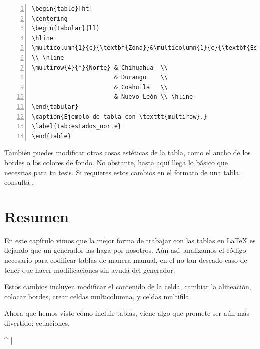 \begin{lstlisting}[style=latex,numbers=left,caption={Tabla con columna de cuatro filas de alto.},label={lst:tabla_estados},
linebackgroundcolor={%
	\ifnum \value{lstnumber} =  7 \color{codigo_linea_resaltada}
	\else \color{codigo_fondo}
	\fi % Tantos \fi como líneas subrayadas.
}]
\begin{table}[ht]
\centering
\begin{tabular}{ll}
\hline
\multicolumn{1}{c}{\textbf{Zona}}&\multicolumn{1}{c}{\textbf{Estado}}
\\ \hline
\multirow{4}{*}{Norte} & Chihuahua  \\
                       & Durango    \\
                       & Coahuila   \\
                       & Nuevo León \\ \hline
\end{tabular}
\caption{Ejemplo de tabla con \texttt{multirow}.}
\label{tab:estados_norte}
\end{table}
\end{lstlisting}

También puedes modificar otras cosas estéticas de la tabla, como el ancho de los bordes o los colores de fondo. No obstante, hasta aquí llega lo básico que necesitas para tu tesis. Si requieres estos cambios en el formato de una tabla, consulta \cite{bib:overleaf_tables}.



\section*{Resumen}



En este capítulo vimos que la mejor forma de trabajar con las tablas en \LaTeX{} es dejando que un generador las haga por nosotros. Aún así, analizamos el código necesario para codificar tablas de manera manual, en el no-tan-deseado caso de tener que hacer modificaciones sin ayuda del generador.

Estos cambios incluyen modificar el contenido de la celda, cambiar la alineación, colocar bordes, crear celdas multicolumna, y celdas multifila.

Ahora que hemos visto cómo incluir tablas, viene algo que promete ser aún más divertido: ecuaciones.

\lstDeleteShortInline^
\lstMakeShortInline[style=latexi]|